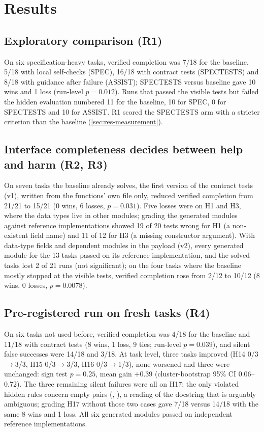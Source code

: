 \documentclass[11pt]{article}
\begin{document}
\section{Results}\label{sec:results}

\subsection{Exploratory comparison (R1)}\label{sec:res-r1}
On six specification-heavy tasks, verified completion was 7/18 for the baseline, 5/18 with local self-checks (SPEC), 16/18 with contract tests (SPECTESTS) and 8/18 with guidance after failure (ASSIST); SPECTESTS versus baseline gave 10 wins and 1 loss (run-level $p=0.012$). Runs that passed the visible tests but failed the hidden evaluation numbered 11 for the baseline, 10 for SPEC, 0 for SPECTESTS and 10 for ASSIST. R1 scored the SPECTESTS arm with a stricter criterion than the baseline (\cref{sec:res-measurement}).

\subsection{Interface completeness decides between help and harm (R2, R3)}\label{sec:res-interface}
On seven tasks the baseline already solves, the first version of the contract tests (v1), written from the functions' own file only, reduced verified completion from 21/21 to 15/21 (0 wins, 6 losses, $p=0.031$). Five losses were on H1 and H3, where the data types live in other modules; grading the generated modules against reference implementations showed 19 of 20 tests wrong for H1 (a non-existent field name) and 11 of 12 for H3 (a missing constructor argument). With data-type fields and dependent modules in the payload (v2), every generated module for the 13 tasks passed on its reference implementation, and the solved tasks lost 2 of 21 runs (not significant); on the four tasks where the baseline mostly stopped at the visible tests, verified completion rose from 2/12 to 10/12 (8 wins, 0 losses, $p=0.0078$).

\subsection{Pre-registered run on fresh tasks (R4)}\label{sec:res-r4}
On six tasks not used before, verified completion was 4/18 for the baseline and 11/18 with contract tests (8 wins, 1 loss, 9 ties; run-level $p=0.039$), and silent false successes were 14/18 and 3/18. At task level, three tasks improved (H14 0/3$\to$3/3, H15 0/3$\to$3/3, H16 0/3$\to$1/3), none worsened and three were unchanged: sign test $p=0.25$, mean gain $+0.39$ (cluster-bootstrap 95\% CI 0.06--0.72). The three remaining silent failures were all on H17; the only violated hidden rules concern empty pairs (, ), a reading of the docstring that is arguably ambiguous; grading H17 without those two cases gave 7/18 versus 14/18 with the same 8 wins and 1 loss. All six generated modules passed on independent reference implementations.
\end{document}

